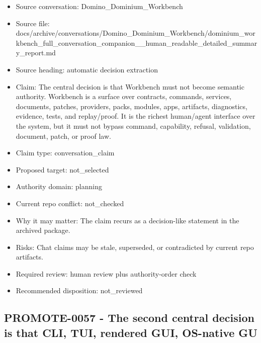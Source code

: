 \documentclass[11pt,a4paper]{report}
\begin{document}
\begin{itemize}
\item Source conversation: Domino\_Dominium\_Workbench
\item Source file: docs/archive/conversations/Domino\_Dominium\_Workbench/dominium\_workbench\_full\_conversation\_companion\_\_human\_readable\_detailed\_summary\_report.md
\item Source heading: automatic decision extraction
\item Claim: The central decision is that Workbench must not become semantic authority. Workbench is a surface over contracts, commands, services, documents, patches, providers, packs, modules, apps, artifacts, diagnostics, evidence, tests, and replay/proof. It is the richest human/agent interface over the system, but it must not bypass command, capability, refusal, validation, document, patch, or proof law.
\item Claim type: conversation\_claim
\item Proposed target: not\_selected
\item Authority domain: planning
\item Current repo conflict: not\_checked
\item Why it may matter: The claim recurs as a decision-like statement in the archived package.
\item Risks: Chat claims may be stale, superseded, or contradicted by current repo artifacts.
\item Required review: human review plus authority-order check
\item Recommended disposition: not\_reviewed
\end{itemize}

\subsection{PROMOTE-0057 - The second central decision is that CLI, TUI, rendered GUI, OS-native GU}
\end{document}
